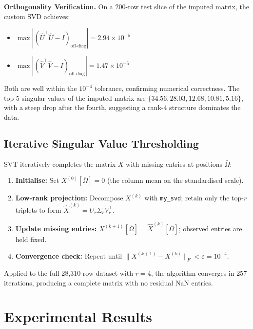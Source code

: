 \documentclass[conference]{IEEEtran}
\begin{document}
\textbf{Orthogonality Verification.} On a 200-row test slice of the imputed matrix, the custom SVD achieves:
\begin{itemize}
    \item $\max |(\hat{U}^\top \hat{U} - I)_{\text{off-diag}}| = 2.94 \times 10^{-5}$ \checkmark
    \item $\max |(\hat{V}^\top \hat{V} - I)_{\text{off-diag}}| = 1.47 \times 10^{-5}$ \checkmark
\end{itemize}
Both are well within the $10^{-4}$ tolerance, confirming numerical correctness. The top-5 singular values of the imputed matrix are $\{34.56, 28.03, 12.68, 10.81, 5.16\}$, with a steep drop after the fourth, suggesting a rank-4 structure dominates the data.

\subsection{Iterative Singular Value Thresholding}

SVT iteratively completes the matrix $X$ with missing entries at positions $\bar{\Omega}$:

\begin{enumerate}[label=\textbf{\Alph*.}]
    \item \textbf{Initialise:} Set $X^{(0)}[\bar{\Omega}] = 0$ (the column mean on the standardised scale).
    \item \textbf{Low-rank projection:} Decompose $X^{(k)}$ with \texttt{my\_svd}; retain only the top-$r$ triplets to form $\hat{X}^{(k)} = U_r \Sigma_r V_r^\top$.
    \item \textbf{Update missing entries:} $X^{(k+1)}[\bar{\Omega}] = \hat{X}^{(k)}[\bar{\Omega}]$; observed entries are held fixed.
    \item \textbf{Convergence check:} Repeat until $\|X^{(k+1)} - X^{(k)}\|_F < \varepsilon = 10^{-4}$.
\end{enumerate}

Applied to the full 28{,}310-row dataset with $r = 4$, the algorithm converges in 257 iterations, producing a complete matrix with no residual NaN entries.

\section{Experimental Results}
\label{sec:results}
\end{document}
